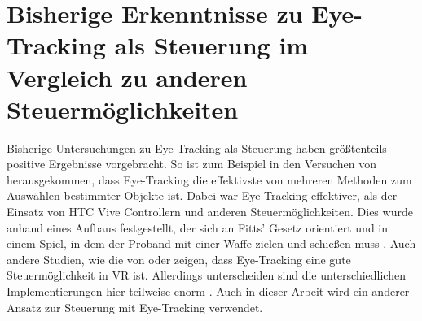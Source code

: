 \section{Bisherige Erkenntnisse zu Eye-Tracking als Steuerung im Vergleich zu anderen Steuermöglichkeiten}
Bisherige Untersuchungen zu Eye-Tracking als Steuerung haben größtenteils positive Ergebnisse vorgebracht. So ist zum Beispiel in den Versuchen von \citeauthor{Pai.2019} herausgekommen, dass Eye-Tracking die effektivste von mehreren Methoden zum Auswählen bestimmter Objekte ist. Dabei war Eye-Tracking effektiver, als der Einsatz von HTC Vive Controllern und anderen Steuermöglichkeiten. Dies wurde anhand eines Aufbaus festgestellt, der sich an Fitts' Gesetz orientiert und in einem Spiel, in dem der Proband mit einer Waffe zielen und schießen muss \cite{Pai.2019}. 
Auch andere Studien, wie die von \citeauthor{D.Kumar.2016} oder \citeauthor{R.Atienza.2016} zeigen, dass Eye-Tracking eine gute Steuermöglichkeit in VR ist. Allerdings unterscheiden sind die unterschiedlichen Implementierungen hier teilweise enorm \cite{Pai.2019} \cite{R.Atienza.2016} \cite{D.Kumar.2016} . Auch in dieser Arbeit wird ein anderer Ansatz zur Steuerung mit Eye-Tracking verwendet.


